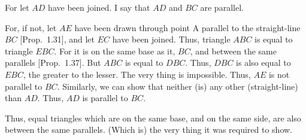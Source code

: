 \begin{Parallel}{}{}
{For let $AD$ have been joined. I say that $AD$ and $BC$ are parallel.

For, if not, let $AE$ have been drawn through point A parallel to the straight-line $BC$ [Prop.~1.31], and let $EC$ have been joined. Thus, triangle $ABC$ is equal
to triangle $EBC$. For it is on the same base as it, $BC$, and between the
same parallels [Prop.~1.37]. But $ABC$ is equal to $DBC$. Thus, $DBC$ is
also equal to $EBC$, the greater to the lesser. The very thing is impossible.
Thus, $AE$ is not parallel to $BC$. Similarly, we can show that neither (is)
any other (straight-line) than $AD$. Thus, $AD$ is parallel to $BC$.

Thus, equal triangles which are on the same base, and on the same side, are
also between the same parallels. (Which is) the very thing it was required to show.}
\end{Parallel}

